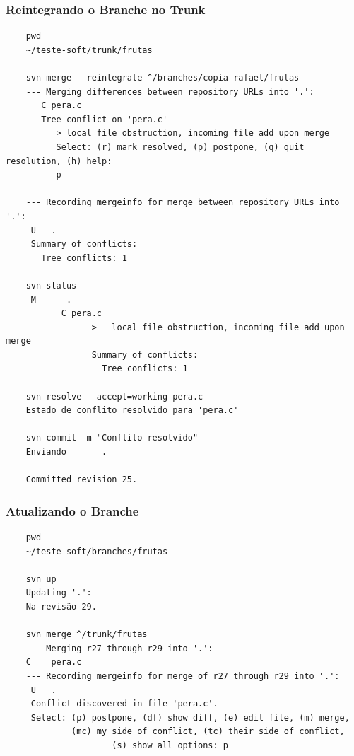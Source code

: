 \documentclass{beamer}
\begin{document}
\begin{frame}[fragile]
    \frametitle{Reintegrando o Branche no Trunk}

    \begin{bash}{}
        {\tiny
            \begin{verbatim}
    pwd
    ~/teste-soft/trunk/frutas

    svn merge --reintegrate ^/branches/copia-rafael/frutas
    --- Merging differences between repository URLs into '.':
       C pera.c
       Tree conflict on 'pera.c'
          > local file obstruction, incoming file add upon merge
          Select: (r) mark resolved, (p) postpone, (q) quit resolution, (h) help: 
          p

    --- Recording mergeinfo for merge between repository URLs into '.':
     U   .
     Summary of conflicts:
       Tree conflicts: 1

    svn status
     M      .
           C pera.c
                 >   local file obstruction, incoming file add upon merge
                 Summary of conflicts:
                   Tree conflicts: 1

    svn resolve --accept=working pera.c
    Estado de conflito resolvido para 'pera.c'

    svn commit -m "Conflito resolvido"
    Enviando       .

    Committed revision 25.
    \end{verbatim}
}
    \end{bash}

\end{frame}

\begin{frame}[fragile]
    \frametitle{Atualizando o Branche}

    \begin{bash}{}
        {\tiny
            \begin{verbatim}
    pwd
    ~/teste-soft/branches/frutas

    svn up
    Updating '.':
    Na revisão 29.

    svn merge ^/trunk/frutas
    --- Merging r27 through r29 into '.':
    C    pera.c
    --- Recording mergeinfo for merge of r27 through r29 into '.':
     U   .
     Conflict discovered in file 'pera.c'.
     Select: (p) postpone, (df) show diff, (e) edit file, (m) merge,
             (mc) my side of conflict, (tc) their side of conflict,
                     (s) show all options: p

    \end{verbatim}
}
    \end{bash}

\end{frame}
\end{document}
